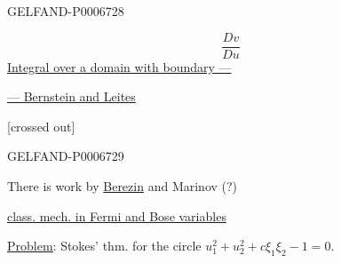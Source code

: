 \begin{GelfandAdjacentEvidence}{GELFAND-P000672}{8}

\[
\frac{Dv}{Du}
\]
\underline{Integral over a domain with boundary ---}

\underline{--- Bernstein and Leites}

[crossed out]
\end{GelfandAdjacentEvidence}
\begin{GelfandAdjacentEvidence}{GELFAND-P000672}{9}


There is work by \underline{Berezin} and Marinov (?)
\end{GelfandAdjacentEvidence}


\underline{class. mech. in Fermi and Bose variables}

\underline{\underline{Problem}}: Stokes’ thm. for the circle \(u_1^2+u_2^2+c\xi_1\xi_2-1=0\).


